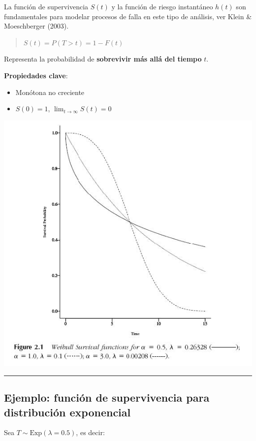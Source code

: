 \documentclass[
  letterpaper,
  ignorenonframetext,
  DIV=11,
  numbers=noendperiod]{scrartcl}
\providecommand{\tightlist}{%
  \setlength{\itemsep}{0pt}\setlength{\parskip}{0pt}}\usepackage{longtable,booktabs,array}
\begin{document}
La función de supervivencia \(S(t)\) y la función de riesgo instantáneo
\(h(t)\) son fundamentales para modelar procesos de falla en este tipo
de análisis, ver Klein \& Moeschberger (2003).

\begin{quote}
\(S(t) = P(T > t) = 1 - F(t)\)
\end{quote}

Representa la probabilidad de \textbf{sobrevivir más allá del tiempo}
\(t\).

\textbf{Propiedades clave}:

\begin{itemize}
\tightlist
\item
  Monótona no creciente\\
\item
  \(S(0) = 1\), \(\lim_{t \to \infty} S(t) = 0\)
\end{itemize}

\begin{center}
\includegraphics[width=0.7\linewidth,height=\textheight,keepaspectratio]{figura/Ss.jpg}
\end{center}

\begin{center}\rule{0.5\linewidth}{0.5pt}\end{center}

\subsection{Ejemplo: función de supervivencia para distribución
exponencial}\label{ejemplo-funciuxf3n-de-supervivencia-para-distribuciuxf3n-exponencial}

Sea \(T \sim \text{Exp}(\lambda = 0.5)\), es decir:
\end{document}
